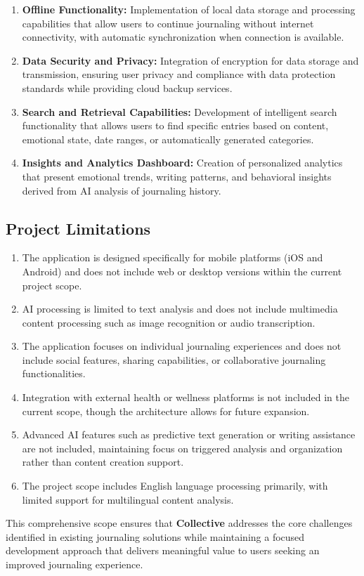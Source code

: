 \begin{enumerate}
	\item \textbf{Offline Functionality:} Implementation of local data storage and processing capabilities that allow users to continue journaling without internet connectivity, with automatic synchronization when connection is available.
	
	\item \textbf{Data Security and Privacy:} Integration of encryption for data storage and transmission, ensuring user privacy and compliance with data protection standards while providing cloud backup services.
	
	\item \textbf{Search and Retrieval Capabilities:} Development of intelligent search functionality that allows users to find specific entries based on content, emotional state, date ranges, or automatically generated categories.
	
	\item \textbf{Insights and Analytics Dashboard:} Creation of personalized analytics that present emotional trends, writing patterns, and behavioral insights derived from AI analysis of journaling history.
\end{enumerate}

\subsection{Project Limitations}\label{subsec:limitations}

\begin{enumerate}
	\item The application is designed specifically for mobile platforms (iOS and Android) and does not include web or desktop versions within the current project scope.
	
	\item AI processing is limited to text analysis and does not include multimedia content processing such as image recognition or audio transcription.
	
	\item The application focuses on individual journaling experiences and does not include social features, sharing capabilities, or collaborative journaling functionalities.
	
	\item Integration with external health or wellness platforms is not included in the current scope, though the architecture allows for future expansion.
	
	\item Advanced AI features such as predictive text generation or writing assistance are not included, maintaining focus on triggered analysis and organization rather than content creation support.
	
	\item The project scope includes English language processing primarily, with limited support for multilingual content analysis.
\end{enumerate}

This comprehensive scope ensures that \textbf{Collective} addresses the core challenges identified in existing journaling solutions while maintaining a focused development approach that delivers meaningful value to users seeking an improved journaling experience.
